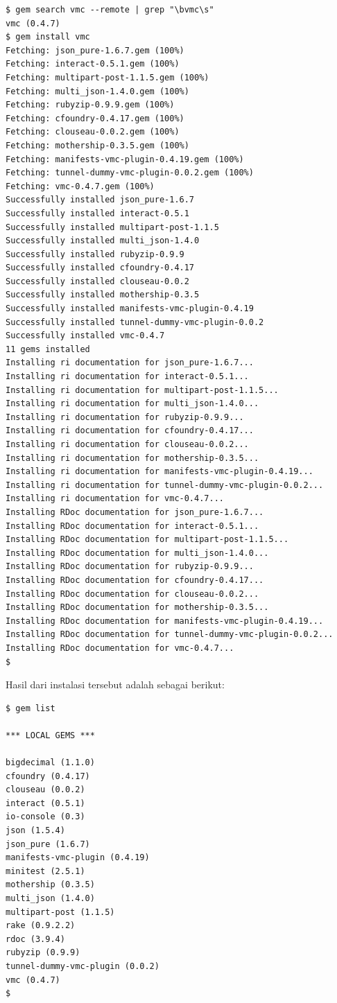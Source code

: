 \lstset{language=bash,caption=Instalasi vmc}
\begin{lstlisting}
$ gem search vmc --remote | grep "\bvmc\s" 
vmc (0.4.7) 
$ gem install vmc 
Fetching: json_pure-1.6.7.gem (100%)
Fetching: interact-0.5.1.gem (100%)
Fetching: multipart-post-1.1.5.gem (100%)
Fetching: multi_json-1.4.0.gem (100%)
Fetching: rubyzip-0.9.9.gem (100%)
Fetching: cfoundry-0.4.17.gem (100%)
Fetching: clouseau-0.0.2.gem (100%)
Fetching: mothership-0.3.5.gem (100%)
Fetching: manifests-vmc-plugin-0.4.19.gem (100%)
Fetching: tunnel-dummy-vmc-plugin-0.0.2.gem (100%)
Fetching: vmc-0.4.7.gem (100%)
Successfully installed json_pure-1.6.7
Successfully installed interact-0.5.1
Successfully installed multipart-post-1.1.5
Successfully installed multi_json-1.4.0
Successfully installed rubyzip-0.9.9
Successfully installed cfoundry-0.4.17
Successfully installed clouseau-0.0.2
Successfully installed mothership-0.3.5
Successfully installed manifests-vmc-plugin-0.4.19
Successfully installed tunnel-dummy-vmc-plugin-0.0.2
Successfully installed vmc-0.4.7
11 gems installed
Installing ri documentation for json_pure-1.6.7...
Installing ri documentation for interact-0.5.1...
Installing ri documentation for multipart-post-1.1.5...
Installing ri documentation for multi_json-1.4.0...
Installing ri documentation for rubyzip-0.9.9...
Installing ri documentation for cfoundry-0.4.17...
Installing ri documentation for clouseau-0.0.2...
Installing ri documentation for mothership-0.3.5...
Installing ri documentation for manifests-vmc-plugin-0.4.19...
Installing ri documentation for tunnel-dummy-vmc-plugin-0.0.2...
Installing ri documentation for vmc-0.4.7...
Installing RDoc documentation for json_pure-1.6.7...
Installing RDoc documentation for interact-0.5.1...
Installing RDoc documentation for multipart-post-1.1.5...
Installing RDoc documentation for multi_json-1.4.0...
Installing RDoc documentation for rubyzip-0.9.9...
Installing RDoc documentation for cfoundry-0.4.17...
Installing RDoc documentation for clouseau-0.0.2...
Installing RDoc documentation for mothership-0.3.5...
Installing RDoc documentation for manifests-vmc-plugin-0.4.19...
Installing RDoc documentation for tunnel-dummy-vmc-plugin-0.0.2...
Installing RDoc documentation for vmc-0.4.7...
$
\end{lstlisting}

Hasil dari instalasi tersebut adalah sebagai berikut:

\lstset{language=bash,caption=Hasil gem yang terinstall}
\begin{lstlisting}
$ gem list 

*** LOCAL GEMS ***

bigdecimal (1.1.0)
cfoundry (0.4.17)
clouseau (0.0.2)
interact (0.5.1)
io-console (0.3)
json (1.5.4)
json_pure (1.6.7)
manifests-vmc-plugin (0.4.19)
minitest (2.5.1)
mothership (0.3.5)
multi_json (1.4.0)
multipart-post (1.1.5)
rake (0.9.2.2)
rdoc (3.9.4)
rubyzip (0.9.9)
tunnel-dummy-vmc-plugin (0.0.2)
vmc (0.4.7)
$ 
\end{lstlisting}

